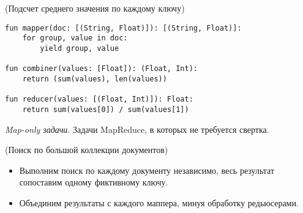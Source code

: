 \begin{example}(Подсчет среднего значения по каждому ключу)
  \begin{lstlisting}
fun mapper(doc: [(String, Float)]): [(String, Float)]:
    for group, value in doc:
        yield group, value

fun combiner(values: [Float]): (Float, Int):
    return (sum(values), len(values))

fun reducer(values: [(Float, Int)]): Float:
    return sum(values[0]) / sum(values[1])
  \end{lstlisting}
\end{example}

\begin{definition}
  \textit{Map-only задачи}. Задачи MapReduce, в которых не требуется свертка.
\end{definition}

\begin{example}(Поиск по большой коллекции документов)
  \begin{itemize}
    \item Выполним поиск по каждому документу независимо, весь результат
      сопоставим одному фиктивному ключу.
    \item Объединим результаты с каждого маппера, минуя обработку редьюсерами.
  \end{itemize}
\end{example}
